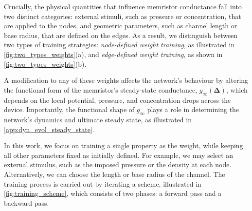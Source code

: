 \documentclass[reprint,superscriptaddress,prb,showkeys]{revtex4-2}
\begin{document}
Crucially, the physical quantities that influence memristor conductance fall into two distinct categories: external stimuli, such as pressure or concentration, that are applied to the nodes, and geometric parameters, such as channel length or base radius, that are defined on the edges. As a result, we distinguish between two types of training strategies: \emph{node-defined weight training}, as illustrated in \cref{fig:two_types_weights}(a), and \emph{edge-defined weight training}, as shown in \cref{fig:two_types_weights}(b).

A modification to any of these weights affects the network's behaviour by altering the functional form of the memristor’s steady-state conductance, $g_{\infty}(\boldsymbol{\Delta})$, which depends on the local potential, pressure, and concentration drops across the device. Importantly, the functional shape of $g_{\infty}$ plays a role in determining the network’s dynamics and ultimate steady state, as illustrated in \cref{app:dyn_evol_steady_state}.

In this work, we focus on training a single property as the weight, while keeping all other parameters fixed as initially defined. For example, we may select an external stimulus, such as the imposed pressure or the density at each node. Alternatively, we can choose the length or base radius of the channel. The training process is carried out by iterating a scheme, illustrated in \cref{fig:training_scheme}, which consists of two phases: a forward pass and a backward pass.
\end{document}
